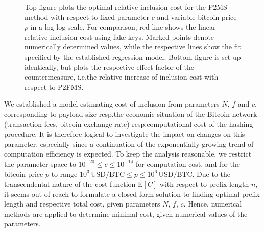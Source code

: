 \documentclass[a4paper,11pt,titlepage]{scrbook}
\begin{document}
\begin{figure}[p]
    \caption[Optimal relative inclusion cost with respect to arbitrary parameters $c$ and bitcoin price $p$]{Top figure plots the optimal relative inclusion cost for the P2MS method with respect to fixed parameter $c$ and variable bitcoin price $p$ in a log-log scale. For comparison, red line shows the linear relative inclusion cost using fake keys.
    Marked points denote numerically determined values, while the respective lines show the fit specified by the established regression model. Bottom figure is set up identically, but plots the respective effect factor of the countermeasure, i.e.\@ the relative increase of inclusion cost with respect to P2FMS.}
    \label{figure:fit}
\end{figure}

We established a model estimating cost of inclusion from parameters $N$, $f$ and $c$, corresponding to payload size resp.\@ the economic situation of the Bitcoin network (transaction fees, bitcoin exchange rate) resp.\@ computational cost of the hashing procedure.
It is therefore logical to investigate the impact on changes on this parameter, especially since a continuation of the exponentially growing trend of computation efficiency is expected. %
To keep the analysis reasonable, we restrict the parameter space to $10^{-20} \leq c \leq 10^{-14}$ for computation cost, and for the bitcoin price $p$ to range $10^3\,\text{USD}/\text{BTC} \leq p \leq 10^6\,\text{USD}/\text{BTC}$.
Due to the transcendental nature of the cost function $\mathrm{E}[C]$ with respect to prefix length $n$, it seems out of reach to formulate a closed-form solution to finding optimal prefix length and respective total cost, given parameters $N$, $f$, $c$.
Hence, numerical methods are applied to determine minimal cost, given numerical values of the parameters.
\end{document}

